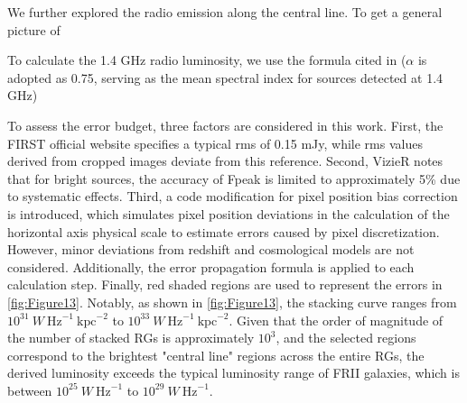 \documentclass{aa}
\begin{document}

We further explored the radio emission along the central line. To get a general picture of  

To calculate the 1.4 GHz radio luminosity, we use the formula cited in \cite{koziel-wierzbowska_identifying_2021} ($\alpha$ is adopted as 0.75, serving as the mean spectral index for sources detected at 1.4 GHz) 
 

To assess the error budget, three factors are considered in this work. First, the FIRST official website specifies a typical rms of 0.15 mJy, while rms values derived from cropped images deviate from this reference. Second, VizieR notes that for bright sources, the accuracy of Fpeak is limited to approximately 5\% due to systematic effects. Third, a code modification for pixel position bias correction is introduced, which simulates pixel position deviations in the calculation of the horizontal axis physical scale to estimate errors caused by pixel discretization. However, minor deviations from redshift and cosmological models are not considered. Additionally, the error propagation formula is applied to each calculation step. Finally, red shaded regions are used to represent the errors in \autoref{fig:Figure13}.
Notably, as shown in \autoref{fig:Figure13}, the stacking curve ranges from $ 10^{31}\ W\ \text{Hz}^{-1}\ \text{kpc}^{-2} $ to $ 10^{33}\ W\ \text{Hz}^{-1}\ \text{kpc}^{-2} $. Given that the order of magnitude of the number of stacked RGs is approximately $ 10^{3} $, and the selected regions correspond to the brightest "central line" regions across the entire RGs, the derived luminosity exceeds the typical luminosity range of FRII galaxies, which is between $ 10^{25}\ W\ \text{Hz}^{-1}  $ to $ 10^{29}\ W\ \text{Hz}^{-1} $\citep[e.g.,][]{an_dynamic_2012}.
\end{document}
